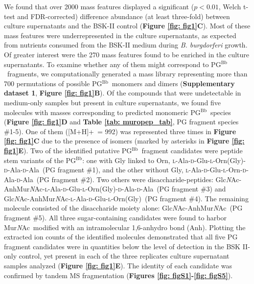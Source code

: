 \documentclass[twoside, watermark]{zHenriquesLab-StyleBioRxiv}
\newcommand{\adductone}{[M+H]+}
\newcommand{\pgbb}{PG$^\text{Bb}$}
\newcommand{\Z}{Glc\textit{N}Ac-AnhMur\textit{N}Ac}
\newcommand{\ZAEOG}{Glc\textit{N}Ac-AnhMur\textit{N}Ac-\textsc{l}-Ala-\textsc{d}-Glu-\textsc{l}-Orn(Gly)}
\newcommand{\ZAEOAAG}{Glc\textit{N}Ac-AnhMur\textit{N}Ac-\textsc{l}-Ala-\textsc{d}-Glu-\textsc{l}-Orn(Gly)-\textsc{d}-Ala-\textsc{d}-Ala}
\newcommand{\AEOAAG}{\textsc{l}-Ala-\textsc{d}-Glu-\textsc{l}-Orn(Gly)-\textsc{d}-Ala-\textsc{d}-Ala}
\newcommand{\AEOAA}{\textsc{l}-Ala-\textsc{d}-Glu-\textsc{l}-Orn-\textsc{d}-Ala-\textsc{d}-Ala}
\newcommand{\NAM}{Mur\textit{N}Ac}
\begin{document}

\vspace{1mm}
We found that over 2000 mass features displayed a significant ($p < 0.01$, Welch t-test and FDR-corrected) difference abundance (at least three-fold) between culture supernatants and the BSK-II control (\textbf{Figure \ref{fig: fig1}C}). Most of these mass features were underrepresented in the culture supernatants, as expected from nutrients consumed from the BSK-II medium during \textit{B. burgdorferi} growth. Of greater interest were the 270 mass features found to be enriched in the culture supernatants. To examine whether any of them might correspond to \pgbb~fragments, we computationally generated a mass library representing more than 700 permutations of possible \pgbb~monomers and dimers (\textbf{Supplementary dataset 1}, \textbf{Figure \ref{fig: fig1}B}). Of the compounds that were undetectable in medium-only samples but present in culture supernatants, we found five molecules with masses corresponding to predicted monomeric \pgbb~species (\textbf{Figure \ref{fig: fig1}D} and \textbf{Table \ref{tab: muropep_tab}}, PG fragment species \#1-5). One of them (\adductone~= 992) was represented three times in \textbf{Figure \ref{fig: fig1}C} due to the presence of isomers (marked by asterisks in \textbf{Figure \ref{fig: fig1}E}). Two of the identified putative \pgbb~fragment candidates were peptide stem variants of the \pgbb: one with Gly linked to Orn, \AEOAAG~(PG fragment \#1), and the other without Gly, \AEOAA~(PG fragment \#2). Two others were disaccharide-peptides: \ZAEOAAG~(PG fragment \#3) and \ZAEOG~(PG fragment \#4). The remaining molecule consisted of the disaccharide moiety alone: \Z~(PG fragment \#5). All three sugar-containing candidates were found to harbor \NAM~modified with an intramolecular 1,6-anhydro bond (Anh). Plotting the extracted ion counts of the identified molecules demonstrated that all five PG fragment candidates were in quantities below the level of detection in the BSK II-only control, yet present in each of the three replicates culture supernatant samples analyzed (\textbf{Figure \ref{fig: fig1}E}). The identity of each candidate was confirmed by tandem MS fragmentation (\textbf{Figures \ref{fig: figS1}-\ref{fig: figS5}}).
\end{document}
